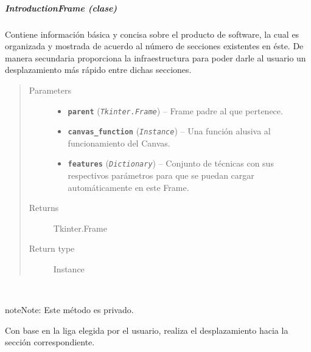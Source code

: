 \documentclass[class=report, crop=false]{standalone}
\begin{document}
\subparagraph{IntroductionFrame (clase)}
\label{sec:a_3_2_1_1_1}
\begin{fulllineitems}

\begin{DUlineblock}{0em}
\item[] Contiene información básica y concisa sobre el producto 
de software, la cual es organizada y mostrada de acuerdo al número 
de secciones existentes en éste.\break
De manera secundaria proporciona la infraestructura para poder 
darle al usuario un desplazamiento más rápido entre dichas 
secciones.
\end{DUlineblock}

\begin{quote}\begin{description}
\item[{Parameters}] \leavevmode\begin{itemize}
\item \textbf{\texttt{parent}} (\emph{\texttt{Tkinter.Frame}}) -- Frame padre al que pertenece.
\item \textbf{\texttt{canvas\_function}} (\emph{\texttt{Instance}}) -- Una función alusiva al funcionamiento del Canvas.
\item \textbf{\texttt{features}} (\emph{\texttt{Dictionary}}) -- Conjunto de técnicas con sus respectivos parámetros para que se puedan cargar automáticamente en este Frame.
\end{itemize}

\item[{Returns}] \leavevmode
Tkinter.Frame
\item[{Return type}] \leavevmode
Instance
\end{description}\end{quote}


\begin{fulllineitems}

~

\begin{notice}{note}{Note:}
Este método es privado.
\end{notice}

Con base en la liga elegida por el usuario, realiza el
desplazamiento hacia la sección correspondiente.


\end{fulllineitems}
\end{fulllineitems}
\end{document}
